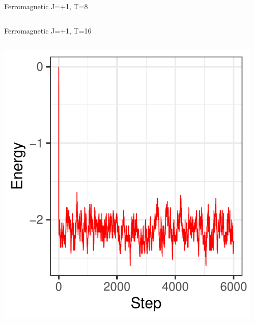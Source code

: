 \documentclass{beamer}
\begin{document}
\begin{frame}{Ferromagnetic J=+1, T=8}
\begin{columns}
\begin{column}{0.5\textwidth}
\begin{center}
     \end{center}
\end{column}
\end{columns}
\end{frame}

\begin{frame}{Ferromagnetic J=+1, T=16}
\begin{columns}
\begin{column}{0.5\textwidth}
    \begin{center}
     \includegraphics[width=\textwidth]{Pic/J+1_10_2500_T=16_ENERGY.pdf}
     \end{center}
\end{column}
\begin{column}{0.5\textwidth}
    \begin{center}

\end{center}
\end{column}
\end{columns}
\end{frame}
\end{document}
